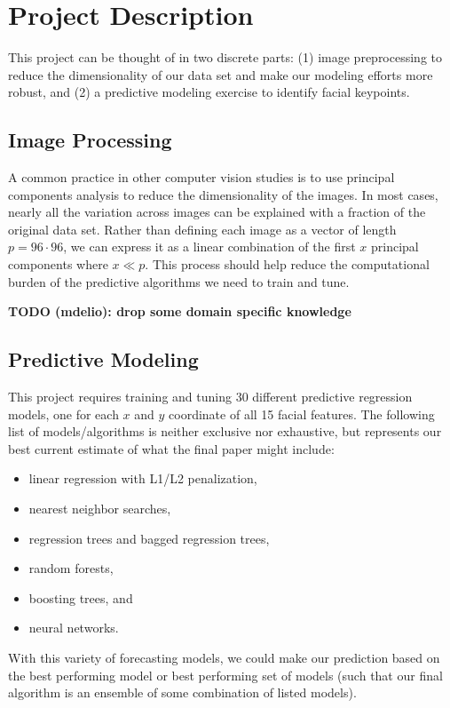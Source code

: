 \documentclass[conference]{IEEEtran}
\begin{document}
\section{Project Description}
This project can be thought of in two discrete parts: (1) image preprocessing to reduce the dimensionality of our data set and make our modeling efforts more robust, and (2) a predictive modeling exercise to identify facial keypoints.

\subsection{Image Processing}
A common practice in other computer vision studies is to use principal components analysis to reduce the dimensionality of the images. In most cases, nearly all the variation across images can be explained with a fraction of the original data set. Rather than defining each image as a vector of length $p=96\cdot96$, we can express it as a linear combination of the first $x$ principal components where $x \ll p$. This process should help reduce the computational burden of the predictive algorithms we need to train and tune.

\textbf{TODO (mdelio): drop some domain specific knowledge}

\subsection{Predictive Modeling}
This project requires training and tuning 30 different predictive regression models, one for each $x$ and $y$ coordinate of all 15 facial features. The following list of models/algorithms is neither exclusive nor exhaustive, but represents our best current estimate of what the final paper might include:
\begin{itemize}
\item linear regression with L1/L2 penalization,
\item nearest neighbor searches,
\item regression trees and bagged regression trees,
\item random forests,
\item boosting trees, and
\item neural networks.
\end{itemize}
With this variety of forecasting models, we could make our prediction based on the best performing model or best performing set of models (such that our final algorithm is an ensemble of some combination of listed models).
\end{document}
